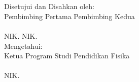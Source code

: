 \begin{pengesahan}


  
{ \Large \ttitle}\\ [4mm] %
{\large \subJudulSkripsiTulis }\\ 
\vfill

{ Disetujui dan Disahkan oleh:}\\ %
{ Pembimbing Pertama}
\hfill {  Pembimbing Kedua}\\ 
[18mm]


{  \underline{\pembimbingPertamaTulis}}
\hfill { \underline{\pembimbingKeduaTulis}}\\
{ NIK. \nikPembimbingPertamaTulis}
\hfill { NIK. \nikPembimbingKeduaTulis}\\

\vfill
{ Mengetahui:}\\ 
{ Ketua Program Studi Pendidikan Fisika} \\ [18mm]


{ \underline{\kaProdiTulis}} \\
{ NIK. \nikKaProdiTulis} \\





\end{pengesahan}

